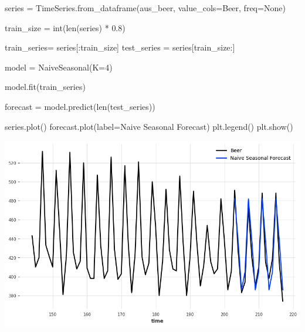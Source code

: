 \documentclass[
  11pt,
]{article}
\newenvironment{Shaded}{\begin{snugshade}}{\end{snugshade}}
\newcommand{\BuiltInTok}[1]{\textcolor[rgb]{0.00,0.23,0.31}{#1}}
\newcommand{\DecValTok}[1]{\textcolor[rgb]{0.68,0.00,0.00}{#1}}
\newcommand{\FloatTok}[1]{\textcolor[rgb]{0.68,0.00,0.00}{#1}}
\newcommand{\NormalTok}[1]{\textcolor[rgb]{0.00,0.23,0.31}{#1}}
\newcommand{\OperatorTok}[1]{\textcolor[rgb]{0.37,0.37,0.37}{#1}}
\newcommand{\StringTok}[1]{\textcolor[rgb]{0.13,0.47,0.30}{#1}}
\newcommand{\VariableTok}[1]{\textcolor[rgb]{0.07,0.07,0.07}{#1}}
\begin{document}
\begin{Shaded}
\begin{Highlighting}[]

\NormalTok{series }\OperatorTok{=}\NormalTok{ TimeSeries.from\_dataframe(aus\_beer, value\_cols}\OperatorTok{=}\StringTok{\textquotesingle{}Beer\textquotesingle{}}\NormalTok{, freq}\OperatorTok{=}\VariableTok{None}\NormalTok{)}
\end{Highlighting}
\end{Shaded}

\begin{Shaded}
\begin{Highlighting}[]

\NormalTok{train\_size }\OperatorTok{=} \BuiltInTok{int}\NormalTok{(}\BuiltInTok{len}\NormalTok{(series) }\OperatorTok{*} \FloatTok{0.8}\NormalTok{)}

\NormalTok{train\_series}\OperatorTok{=}\NormalTok{ series[:train\_size]}
\NormalTok{test\_series }\OperatorTok{=}\NormalTok{ series[train\_size:]}

\NormalTok{model }\OperatorTok{=}\NormalTok{ NaiveSeasonal(K}\OperatorTok{=}\DecValTok{4}\NormalTok{)}

\NormalTok{model.fit(train\_series)}

\NormalTok{forecast }\OperatorTok{=}\NormalTok{ model.predict(}\BuiltInTok{len}\NormalTok{(test\_series))}

\NormalTok{series.plot()}
\NormalTok{forecast.plot(label}\OperatorTok{=}\StringTok{\textquotesingle{}Naive Seasonal Forecast\textquotesingle{}}\NormalTok{)}
\NormalTok{plt.legend()}
\NormalTok{plt.show()}
\end{Highlighting}
\end{Shaded}

\includegraphics{hw3_files/figure-pdf/cell-35-output-1.png}
\end{document}
